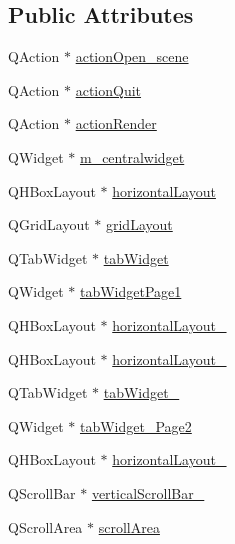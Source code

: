 \subsection*{Public Attributes}
\begin{DoxyCompactItemize}
\item 
Q\+Action $\ast$ \hyperlink{classUi__MainWindow_ae58c43ecf4d0e38e14932c84769f48c4}{action\+Open\+\_\+scene}
\item 
Q\+Action $\ast$ \hyperlink{classUi__MainWindow_a188c243f36a2dbc10e4e2a0ad94273b1}{action\+Quit}
\item 
Q\+Action $\ast$ \hyperlink{classUi__MainWindow_a180c6bbc463de2610d5f136e3797fa98}{action\+Render}
\item 
Q\+Widget $\ast$ \hyperlink{classUi__MainWindow_a28f5edc21a751da410f77521305dd1a7}{m\+\_\+centralwidget}
\item 
Q\+H\+Box\+Layout $\ast$ \hyperlink{classUi__MainWindow_acd6fdc9ebacc4b25b834162380d75ce8}{horizontal\+Layout}
\item 
Q\+Grid\+Layout $\ast$ \hyperlink{classUi__MainWindow_a525ed3c5fe0784ac502ee222fba4e205}{grid\+Layout}
\item 
Q\+Tab\+Widget $\ast$ \hyperlink{classUi__MainWindow_a3260b943854b841c986f47c4726ee7f9}{tab\+Widget}
\item 
Q\+Widget $\ast$ \hyperlink{classUi__MainWindow_a9ab66644017a77a0b3e39f1344ef9d0e}{tab\+Widget\+Page1}
\item 
Q\+H\+Box\+Layout $\ast$ \hyperlink{classUi__MainWindow_a8ead8fc876ee91c30864822eedb9c370}{horizontal\+Layout\+\_}
\item 
Q\+H\+Box\+Layout $\ast$ \hyperlink{classUi__MainWindow_a2afb915e1492b7e6704db4918c1e5e80}{horizontal\+Layout\+\_}
\item 
Q\+Tab\+Widget $\ast$ \hyperlink{classUi__MainWindow_abad0690efa1c9be5f384e20a19762187}{tab\+Widget\+\_}
\item 
Q\+Widget $\ast$ \hyperlink{classUi__MainWindow_a4926c6794c8803e2973a03e3fae0a42d}{tab\+Widget\+\_\+Page2}
\item 
Q\+H\+Box\+Layout $\ast$ \hyperlink{classUi__MainWindow_a03ce63974cc69b067c91bbf285cceca8}{horizontal\+Layout\+\_}
\item 
Q\+Scroll\+Bar $\ast$ \hyperlink{classUi__MainWindow_a1f43790be11311624c245154d0259019}{vertical\+Scroll\+Bar\+\_}
\item 
Q\+Scroll\+Area $\ast$ \hyperlink{classUi__MainWindow_ac5779d53b47a565785fec252abb1b3c6}{scroll\+Area}
\item 

\end{DoxyCompactItemize}
